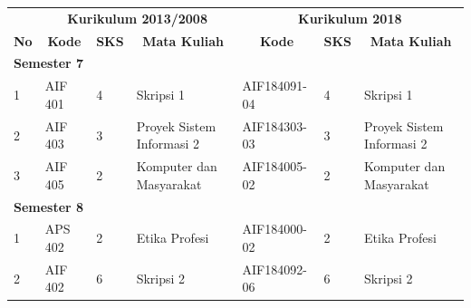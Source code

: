 \begin{table}[H]
\centering
\label{tab:aturankonversiwajib_3}
\begin{tabular}{|p{0.35cm}|p{2cm}|p{0.55cm}|p{3.45cm}|p{2.65cm}|p{0.55cm}|p{3.45cm}|}
\hline
\multicolumn{1}{|c|}{} & \multicolumn{3}{c|}{\textbf{Kurikulum 2013/2008}} & \multicolumn{3}{c|}{\textbf{Kurikulum 2018}} \\ \cline{2-7} 
\multicolumn{1}{|c|}{\multirow{-2}{*}{\textbf{No}}} & \multicolumn{1}{c|}{\textbf{Kode}} & \multicolumn{1}{c|}{\textbf{SKS}} & \multicolumn{1}{c|}{\textbf{Mata Kuliah}} & \multicolumn{1}{c|}{\textbf{Kode}} & \multicolumn{1}{c|}{\textbf{SKS}} & \multicolumn{1}{c|}{\textbf{Mata Kuliah}} \\ \hline
\multicolumn{7}{|l|}{\textbf{Semester 7}} \\ \hline
1 & AIF 401 & 4 & Skripsi 1 & AIF184091-04 & 4 & Skripsi 1 \\ \hline
2 & AIF 403 & 3 & Proyek Sistem Informasi 2 & AIF184303-03 & 3 & Proyek Sistem Informasi 2 \\ \hline
3 & AIF 405 & 2 & Komputer dan Masyarakat & AIF184005-02 & 2 & Komputer dan Masyarakat \\ \hline
\multicolumn{7}{|l|}{\textbf{Semester 8}} \\ \hline
1 & APS 402 & 2 & Etika Profesi & AIF184000-02 & 2 & Etika Profesi \\ \hline
2 & AIF 402 & 6 & Skripsi 2 & AIF184092-06 & 6 & Skripsi 2 \\ \hline
\end{tabular}
\end{table}

